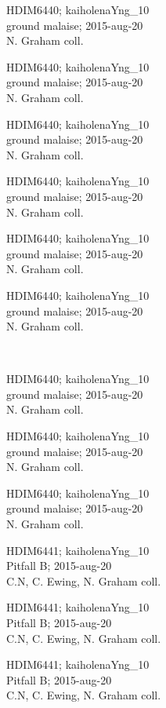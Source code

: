 \documentclass[2pt]{extarticle}
\begin{document}
\noindent
\parbox{0.16\textwidth}{\tiny \raggedright \rule[-0.3\baselineskip]{0pt}{10pt}HDIM6440; kaiholenaYng\_10\\ ground malaise; 2015-aug-20\\ N. Graham coll.}
\parbox{0.16\textwidth}{\tiny \raggedright \rule[-0.3\baselineskip]{0pt}{10pt}HDIM6440; kaiholenaYng\_10\\ ground malaise; 2015-aug-20\\ N. Graham coll.}
\parbox{0.16\textwidth}{\tiny \raggedright \rule[-0.3\baselineskip]{0pt}{10pt}HDIM6440; kaiholenaYng\_10\\ ground malaise; 2015-aug-20\\ N. Graham coll.}
\parbox{0.16\textwidth}{\tiny \raggedright \rule[-0.3\baselineskip]{0pt}{10pt}HDIM6440; kaiholenaYng\_10\\ ground malaise; 2015-aug-20\\ N. Graham coll.}
\parbox{0.16\textwidth}{\tiny \raggedright \rule[-0.3\baselineskip]{0pt}{10pt}HDIM6440; kaiholenaYng\_10\\ ground malaise; 2015-aug-20\\ N. Graham coll.}
\parbox{0.16\textwidth}{\tiny \raggedright \rule[-0.3\baselineskip]{0pt}{10pt}HDIM6440; kaiholenaYng\_10\\ ground malaise; 2015-aug-20\\ N. Graham coll.} \\ 
\vspace{0.001in} 

\noindent
\parbox{0.16\textwidth}{\tiny \raggedright \rule[-0.3\baselineskip]{0pt}{10pt}HDIM6440; kaiholenaYng\_10\\ ground malaise; 2015-aug-20\\ N. Graham coll.}
\parbox{0.16\textwidth}{\tiny \raggedright \rule[-0.3\baselineskip]{0pt}{10pt}HDIM6440; kaiholenaYng\_10\\ ground malaise; 2015-aug-20\\ N. Graham coll.}
\parbox{0.16\textwidth}{\tiny \raggedright \rule[-0.3\baselineskip]{0pt}{10pt}HDIM6440; kaiholenaYng\_10\\ ground malaise; 2015-aug-20\\ N. Graham coll.}
\parbox{0.16\textwidth}{\tiny \raggedright \rule[-0.3\baselineskip]{0pt}{10pt}HDIM6441; kaiholenaYng\_10\\ Pitfall B; 2015-aug-20\\ C.N, C. Ewing, N. Graham coll.}
\parbox{0.16\textwidth}{\tiny \raggedright \rule[-0.3\baselineskip]{0pt}{10pt}HDIM6441; kaiholenaYng\_10\\ Pitfall B; 2015-aug-20\\ C.N, C. Ewing, N. Graham coll.}
\parbox{0.16\textwidth}{\tiny \raggedright \rule[-0.3\baselineskip]{0pt}{10pt}HDIM6441; kaiholenaYng\_10\\ Pitfall B; 2015-aug-20\\ C.N, C. Ewing, N. Graham coll.} \\ 
\vspace{0.001in} 
\end{document}
